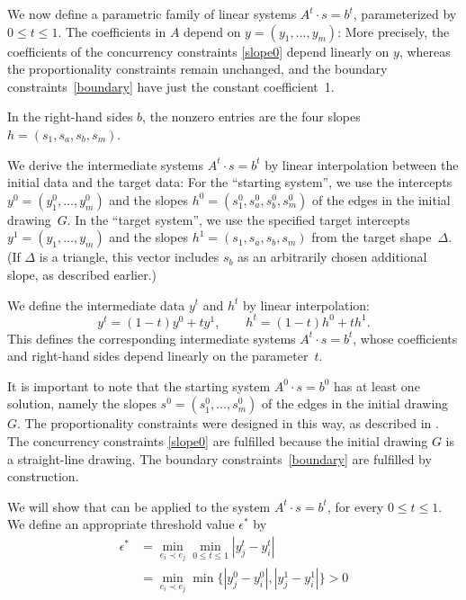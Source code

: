We now define a parametric family of linear systems
 $A^t\cdot s = b^t$, parameterized by $0\le t\le 1$.
 The coefficients
 in $A$
 depend on $y=(y_1,\ldots,y_m)$:
 More precisely, the coefficients of the
 concurrency constraints
 \eqref{slope0} depend linearly on $y$,
 whereas
 the
 proportionality constraints 
 \thetag{\ref{eq:proportion}--\ref{eq:proportion2}} remain unchanged,
 and the boundary constraints~\eqref{boundary} have just the constant coefficient~1.
 
In the right-hand sides $b$,
the nonzero entries
are the four slopes
$h=(s_1,s_a,s_b,s_m)$.

We derive the intermediate systems 
$A^t\cdot s = b^t$ by linear interpolation between the initial data
and the target data:
For the ``starting system'', we use
the intercepts
 $y^0=(y_1^0,\ldots,y_m^0)$
 and the slopes
 $h^0=(s_1^0,s_a^0,s_b^0,s_m^0)$
 of the edges in the initial drawing~$G$.
In the ``target system'', we use
the specified target intercepts
 $y^1=(y_1,\ldots,y_m)$
 and the slopes
 $h^1=(s_1,s_a,s_b,s_m)$ from the target shape~$\Delta$.
(If $\Delta$ is a triangle, this vector includes $s_b$ as an arbitrarily chosen
additional slope, as described earlier.)

 
We define the intermediate data $y^t$ and $h^t$
by linear interpolation:
\begin{equation*}
  y^t = (1-t)y^0 + ty^1,
  \qquad
  h^t = (1-t)h^0 + th^1.
\end{equation*}
This defines the corresponding intermediate systems 
$A^t\cdot s = b^t$, whose coefficients and right-hand sides depend
linearly on the parameter~$t$.

It is important to note that
the starting system
$A^0\cdot s = b^0$
has at least one solution, %
namely the slopes
$s^0=(s_1^0,\ldots,s_m^0)$
 of the edges in the initial drawing $G$.
 The proportionality constraints
  \thetag{\ref{eq:proportion}--\ref{eq:proportion2}} were designed
  in this way, as described in .
 The
 concurrency constraints
 \eqref{slope0} are fulfilled because the initial drawing $G$ is a
 straight-line drawing.
 The boundary constraints~\eqref{boundary} are fulfilled by
 construction.



We will show that  can be applied to the
system $A^t\cdot s=b^t$, for every $0\le t\le 1$. We define
an appropriate threshold value $  \epsilon^*$ by
\begin{align*}
  \epsilon^*&
              =
              \min_{e_i\prec e_j}  
              \min_{0\le t\le 1}
              |y_j^t-y_i^t| %
 \\            &
              =%
              \min_{e_i\prec e_j}  
              \min\{|y_j^0-y_i^0|,|y_j^1-y_i^1|\}%
              > 0
\end{align*}





